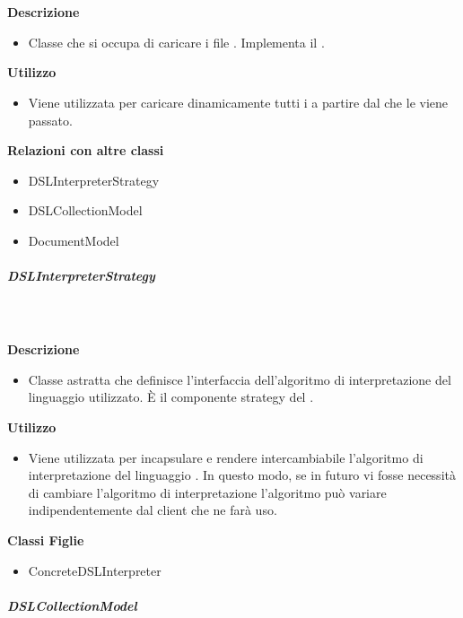         \textbf{\\ \\ Descrizione} 
          \begin{itemize}
            \item[] Classe che si occupa di caricare i file . Implementa il  .
          \end{itemize}      
        \textbf{Utilizzo}  
          \begin{itemize}
            \item[] Viene utilizzata per caricare dinamicamente tutti i  a partire dal  che le viene passato.
          \end{itemize}
          \textbf{Relazioni con altre classi}
          \begin{itemize}
              \item{DSLInterpreterStrategy}
              \item{DSLCollectionModel}
              \item{DocumentModel}
          \end{itemize}
      \subparagraph{DSLInterpreterStrategy}
        
        \textbf{\\ \\ Descrizione} 
          \begin{itemize}
            \item[] Classe astratta che definisce l'interfaccia dell'algoritmo di interpretazione del linguaggio  utilizzato. È il componente strategy del  .
          \end{itemize}      
        \textbf{Utilizzo}  
          \begin{itemize}
            \item[] Viene utilizzata per incapsulare e rendere intercambiabile l'algoritmo di interpretazione del linguaggio . In questo modo, se in futuro vi fosse necessità di cambiare l'algoritmo di interpretazione l'algoritmo può variare indipendentemente dal client che ne farà uso.
          \end{itemize}
          \textbf{Classi Figlie}
          \begin{itemize}
              \item{ConcreteDSLInterpreter}
          \end{itemize}
      \subparagraph{DSLCollectionModel}
        
